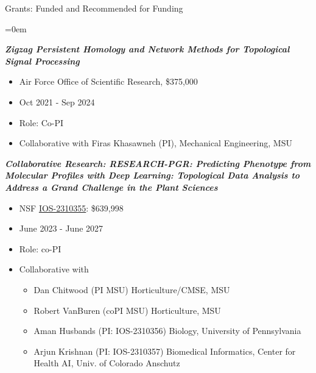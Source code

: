 \documentclass{resume} %
\begin{document}
\begin{rSection}{Grants: Funded and Recommended for Funding}
\begin{itemize}{}{\leftmargin=0em}
\end{itemize}

\textbf{\textit{Zigzag Persistent Homology and Network Methods for Topological Signal Processing}}
\vspace{-.1in}
\begin{itemize}{}{\leftmargin=0em}
   \itemsep -0.6em %
   \item Air Force Office of Scientific Research, \$375,000
\item
Oct 2021 - Sep 2024
   \item
Role: Co-PI
\item Collaborative with Firas Khasawneh (PI), Mechanical Engineering, MSU

\end{itemize}

\textbf{\textit{Collaborative Research: RESEARCH-PGR: Predicting Phenotype from Molecular Profiles with Deep Learning: Topological Data Analysis to Address a Grand Challenge in the Plant Sciences}}
\vspace{-.1in}
\begin{itemize}{}{\leftmargin=0em}
   \itemsep -0.6em %
   \item
NSF \href{https://nsf.gov/awardsearch/showAward?AWD_ID=2310355}{IOS-2310355}:  \$639,998
\item
June 2023 - June 2027
   \item
Role: co-PI
\item Collaborative with
\begin{itemize}
   \itemsep -0.6em %
   \item Dan Chitwood (PI MSU) Horticulture/CMSE, MSU 
   \item  Robert VanBuren (coPI MSU) Horticulture, MSU
   \item Aman Husbands (PI: IOS-2310356) Biology, University of Pennsylvania
   \item Arjun Krishnan (PI: IOS-2310357) Biomedical Informatics, Center for Health AI, Univ. of Colorado Anschutz
\end{itemize}

\end{itemize}


\end{rSection}
\end{document}
